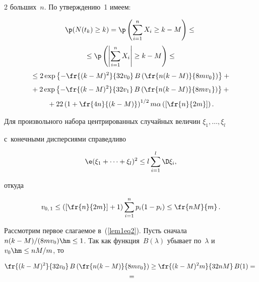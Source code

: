 \begin{multicols}{2}
больших~$n$. По утверждению~1 имеем:

\begin{multline}

\p(N(t_k)\geq k) = \p\left(\sum\limits_{i=1}^n X_i \geq k-M\right) \leq {}\\[3pt]

{}\leq

\p\left(\left|\sum\limits_{i=1}^n X_i \right| \geq k-M\right) \leq{}\\[3pt]

{}\leq 2 \exp\left\{-\fr{(k-M)^2}{32 v_0}\, B\left(\fr{n(k-M)}{8m  v_0}\right)\right\}+{}\\[3pt]

{}+2 \exp\left\{-\fr{(k-M)^2}{32 v_1}\, B\left(

\fr{n(k-M)}{8m v_1}\right)\right\} +{}\\[3pt]

{}+ 22\left(1+\fr{4n}{(k-M)}\right)^{1/2} m  \alpha\left(\left[\fr{n}{2m}\right]\right).

\label{lem1eq2}

\end{multline}

Для произвольного набора центрированных случайных величин $\xi_1, \ldots, \xi_l$ 

с~конечными дисперсиями справедливо

$$

\e(\xi_1 + \cdots + \xi_l)^2 \leq l\sum\limits_{i=1}^l \D \xi_i,

$$

откуда

$$

v_{0,\,1} \leq \left(\left[\fr{n}{2m}\right]+1\right) \sum\limits_{i=1}^n  p_i(1-p_i) \leq \fr{nM}{m}\,.

$$



Рассмотрим первое слагаемое в~(\ref{lem1eq2}). Пусть сначала $n(k-M)/(8mv_0) 

\hm\leq 1$. Так как функция~$B(\lambda)$ убывает по~$\lambda$ и $v_0 \hm\leq nM/m$, то



\noindent

\begin{multline*}

\fr{(k-M)^2}{32 v_0}\, B\left(\fr{n(k-M)}{8m v_0}\right) \geq \fr{(k-M)^2 m}{32nM}\, B(1) ={}\\

{}=


\end{multline*}
\end{multicols}
